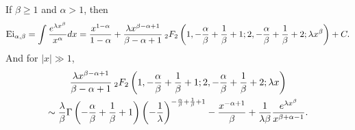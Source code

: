 \documentclass[smallextended]{svjour3}
\begin{document}
\begin{theorem}
If $\beta\ge1$ and $\alpha>1$, then
\begin{equation}
\text{Ei}_{\alpha,\beta}=\int \frac{e^{\lambda x^\beta}}{x^\alpha}dx=\frac{x^{1-\alpha}}{1-\alpha}+\frac{\lambda x^{\beta-\alpha+1}}{\beta-\alpha+1}\hspace{.075cm}   _{2}F_{2}\left(1,-\frac{\alpha}{\beta}+\frac{1}{\beta}+1;2,-\frac{\alpha}{\beta}+\frac{1}{\beta}+2;\lambda x^\beta\right)+C.
\label{Thm6-1}
\end{equation}
And for $|x|\gg1$,
\begin{multline}
\frac{\lambda x^{\beta-\alpha+1}}{\beta-\alpha+1} \hspace{.075cm}_{2}F_{2}\left(1,-\frac{\alpha}{\beta}+\frac{1}{\beta}+1;2,-\frac{\alpha}{\beta}+\frac{1}{\beta}+2;\lambda x\right)\\
\sim \frac{\lambda}{\beta} \Gamma\left(-\frac{\alpha}{\beta}+\frac{1}{\beta}+1\right)\left(-\frac{1}{\lambda }\right)^{-\frac{\alpha}{\beta}+\frac{1}{\beta}+1}-\frac{x^{-\alpha+1}}{\beta}
+\frac{1}{\lambda\beta}\frac{e^{\lambda x^\beta}}{x^{\beta+\alpha-1}}.
\label{Thm6-2}
\end{multline}
\label{Thm6}
\end{theorem}
\end{document}
